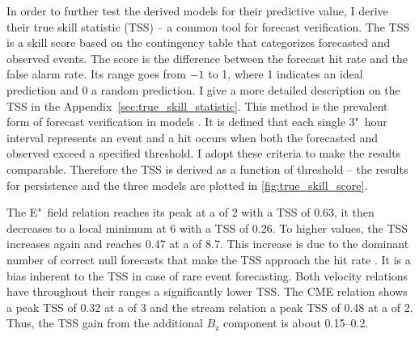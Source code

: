In order to further test the derived models for their predictive value, I derive their true skill statistic (TSS) -- a common tool for forecast verification. The TSS is a skill score based on the contingency table that categorizes forecasted and observed events. The score is the difference between the forecast hit rate and the false alarm rate. Its range goes from $-1$ to 1, where 1 indicates an ideal prediction and 0 a random prediction. I give a more detailed description on the TSS in the Appendix~\ref{sec:true_skill_statistic}. This method is the prevalent form of forecast verification in \Kp{} models \citep{Detman1999,Wing2005,Savani2017}. It is defined that each single 3"~hour \Kp{} interval represents an event and a hit occurs when both the forecasted and observed \Kp{} exceed a specified threshold. I adopt these criteria to make the results comparable. Therefore the TSS is derived as a function of \Kp{} threshold -- the results for persistence and the three models are plotted in \autoref{fig:true_skill_score}.
\begin{figure}
\end{figure}

The E"~field relation reaches its peak at a \Kp{} of 2 with a TSS of 0.63, it then decreases to a local minimum at \Kp{} 6 with a TSS of 0.26. To higher \Kp{} values, the TSS increases again and reaches 0.47 at a \Kp{} of 8.7. This increase is due to the dominant number of correct null forecasts that make the TSS approach the hit rate \citep{Doswell1990}. It is a bias inherent to the TSS in case of rare event forecasting. Both velocity relations have throughout their \Kp{} ranges a significantly lower TSS. The CME relation shows a peak TSS of 0.32 at a \Kp{} of 3 and the stream relation a peak TSS of 0.48 at a \Kp{} of 2. Thus, the TSS gain from the additional $B_\text{z}$ component is about \numrange{0.15}{0.2}.\\

